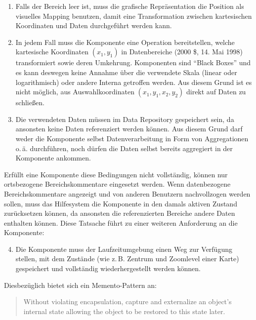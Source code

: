 \documentclass[
	headsepline,
	footsepline,
	fontsize=12pt,
	bibliography=totoc
]{scrbook}
\begin{document}
\begin{enumerate}
	\item Falls der Bereich leer ist, muss die grafische Repräsentation die Position als visuelles Mapping benutzen, damit eine Transformation zwischen kartesischen Koordinaten und Daten durchgeführt werden kann.
	\item In jedem Fall muss die Komponente eine Operation bereitstellen, welche kartesische Koordinaten $(x_1,y_1)$ in Datenbereiche (2000 \$, 14. Mai 1998) transformiert sowie deren Umkehrung. Komponenten sind \enquote{Black Boxes} und es kann deswegen keine Annahme über die verwendete Skala (linear oder logarithmisch) oder andere Interna getroffen werden. Aus diesem Grund ist es nicht möglich, aus Auswahlkoordinaten $(x_1,y_1,x_2,y_2)$ direkt auf Daten zu schließen.
	\item Die verwendeten Daten müssen im Data Repository gespeichert sein, da ansonsten keine Daten referenziert werden können. Aus diesem Grund darf weder die Komponente selbst Datenverarbeitung in Form von Aggregationen o.\,ä. durchführen, noch dürfen die Daten selbst bereits aggregiert in der Komponente ankommen.
\end{enumerate}

Erfüllt eine Komponente diese Bedingungen nicht vollständig, können nur ortsbezogene Bereichskommentare eingesetzt werden. Wenn datenbezogene Bereichskommentare angezeigt und von anderen Benutzern nachvollzogen werden sollen, muss das Hilfesystem die Komponente in den damals aktiven Zustand zurücksetzen können, da ansonsten die referenzierten Bereiche andere Daten enthalten können. Diese Tatsache führt zu einer weiteren Anforderung an die Komponente:

\begin{enumerate}
	\setcounter{enumi}{3}
	\item Die Komponente muss der Laufzeitumgebung einen Weg zur Verfügung stellen, mit dem Zustände (wie z.\,B. Zentrum und Zoomlevel einer Karte) gespeichert und vollständig wiederhergestellt werden können.
\end{enumerate}

Diesbezüglich bietet sich ein Memento-Pattern \cite{Gamma1994} an:

\begin{quote}
Without violating encapsulation, capture and externalize an object's internal state allowing the object to be restored to this state later.
\end{quote} 
\end{document}
